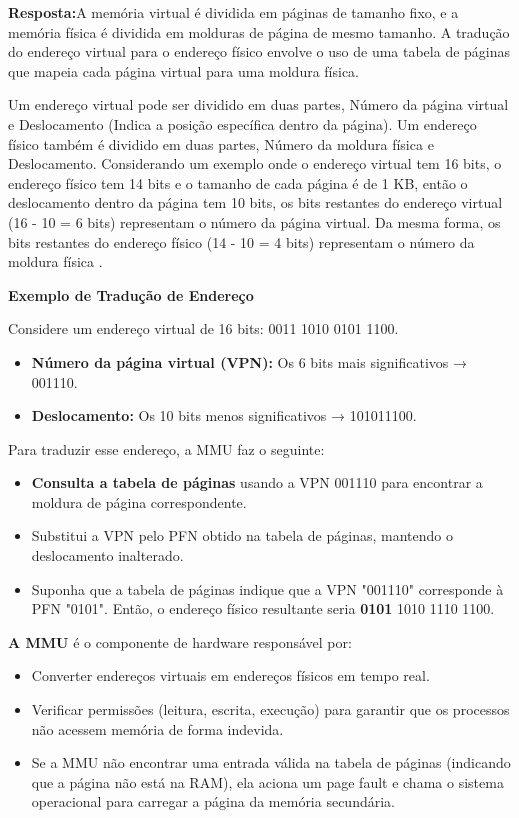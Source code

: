 \documentclass{article}
\begin{document}
\textbf{Resposta:}A memória virtual é dividida em páginas de tamanho fixo, e a memória física é dividida em molduras de página de mesmo tamanho. A tradução do endereço virtual para o endereço físico envolve o uso de uma tabela de páginas que mapeia cada página virtual para uma moldura física.

Um endereço virtual pode ser dividido em duas partes, Número da página virtual e Deslocamento (Indica a posição específica dentro da página). Um endereço físico também é dividido em duas partes, Número da moldura física e Deslocamento. Considerando um exemplo onde o endereço virtual tem 16 bits, o endereço físico tem 14 bits e o tamanho de cada página é de 1 KB, então o deslocamento dentro da página tem 10 bits, os bits restantes do endereço virtual (16 - 10 = 6 bits) representam o número da página virtual. Da mesma forma, os bits restantes do endereço físico (14 - 10 = 4 bits) representam o número da moldura física \cite{tanenbaum2021, resumosLEIC, gomesAula18}.\newline

\textbf{Exemplo de Tradução de Endereço}\newline

Considere um endereço virtual de 16 bits: 0011 1010 0101 1100.
\begin{itemize}
    \item \textbf{Número da página virtual (VPN):} Os 6 bits mais significativos → 001110.
    \item \textbf{Deslocamento: }Os 10 bits menos significativos → 101011100.
\end{itemize}

Para traduzir esse endereço, a MMU faz o seguinte:

\begin{itemize}
    \item \textbf{Consulta a tabela de páginas} usando a VPN 001110 para encontrar a moldura de página correspondente.
    \item Substitui a VPN pelo PFN obtido na tabela de páginas, mantendo o deslocamento inalterado.
    \item Suponha que a tabela de páginas indique que a VPN "001110" corresponde à PFN "0101". Então, o endereço físico resultante seria \textbf{0101} 1010 1110 1100.\newline
\end{itemize}

\textbf{A MMU} é o componente de hardware responsável por:

\begin{itemize}
    \item Converter endereços virtuais em endereços físicos em tempo real.
    \item Verificar permissões (leitura, escrita, execução) para garantir que os processos não acessem memória de forma indevida.
    \item Se a MMU não encontrar uma entrada válida na tabela de páginas (indicando que a página não está na RAM), ela aciona um page fault e chama o sistema operacional para carregar a página da memória secundária.
\end{itemize}
\end{document}
